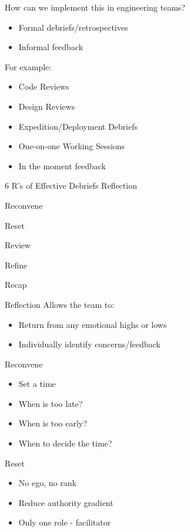 \documentclass[aspectratio=169]{beamer}
\begin{document}
\begin{frame}{How can we implement this in engineering teams?}
    \begin{itemize}
        \item Formal debriefs/retrospectives
        \item Informal feedback
    \end{itemize}

    For example:
    \begin{itemize}
        \item Code Reviews
        \item Design Reviews
        \item Expedition/Deployment Debriefs
        \item One-on-one Working Sessions
        \item In the moment feedback
    \end{itemize}
\end{frame}
\begin{frame}{6 R's of Effective Debriefs}
    Reflection

    Reconvene

    Reset

    Review

    Refine

    Recap
\end{frame}
\begin{frame}{Reflection}
    Allows the team to:
    \begin{itemize}
        \item Return from any emotional highs or lows
        \item Individually identify concerns/feedback
    \end{itemize}
\end{frame}
\begin{frame}{Reconvene}
    \begin{itemize}
        \item Set a time
        \item When is too late?
        \item When is too early?
        \item When to decide the time?
    \end{itemize}
\end{frame}
\begin{frame}{Reset}
    \begin{itemize}
        \item No ego, no rank
        \item Reduce authority gradient
        \item Only one role - facilitator
    \end{itemize}
\end{frame}
\end{document}
